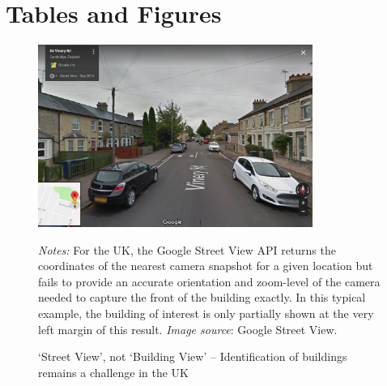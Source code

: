 \documentclass[]{article}
\begin{document}
\newpage
\clearpage

\hypertarget{tables-and-figures}{%
\section{Tables and Figures}\label{tables-and-figures}}

\begin{figure}[hbt]
  \caption{`Street View', not `Building View' -- Identification of buildings remains a challenge in the UK}
  \centering
  \vspace{0.25cm}
    \includegraphics[width=0.8\textwidth]{figures/84VineryRD.png}
  \label{fig:84Vin}
\begin{minipage}{0.8\textwidth}
\footnotesize 
\vspace{0.25cm}
\emph{Notes:} For the UK, the Google Street View API returns the coordinates of the nearest camera snapshot for a given location but fails to provide an accurate orientation and zoom-level of the camera needed to capture the front of the building exactly. In this typical example, the building of interest is only partially shown at the very left margin of this result.  \emph{Image source}: Google Street View. 
\end{minipage}
\end{figure}
\end{document}
